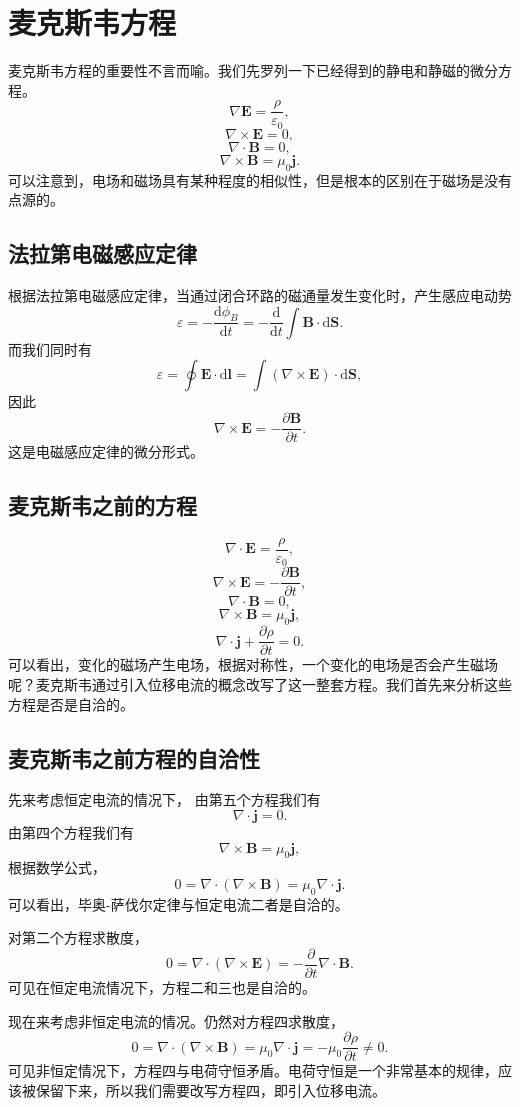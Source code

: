 \documentclass[UTF8]{ctexbook}
\renewcommand{\d}{\mathrm{d}}
\renewcommand{\b}{\boldsymbol}
\numberwithin{equation}{chapter}
\begin{document}
	\section{麦克斯韦方程}
	麦克斯韦方程的重要性不言而喻。我们先罗列一下已经得到的静电和静磁的微分方程。
	\[\nabla\b{E}=\frac{\rho}{\varepsilon_0},\]
	\[\nabla\times \b{E}=0,\]
	\[\nabla\cdot\b{B}=0,\]
	\[\nabla\times\b{B}=\mu_0\b{j}.\]
	可以注意到，电场和磁场具有某种程度的相似性，但是根本的区别在于磁场是没有点源的。
	\subsection{法拉第电磁感应定律}
	
	根据法拉第电磁感应定律，当通过闭合环路的磁通量发生变化时，产生感应电动势
	\[\varepsilon=-\frac{\d\phi_B}{\d t}=-\frac{\d }{\d t}\int\b{B}\cdot\d\b{S}.\]
	而我们同时有
	\[\varepsilon=\oint \b{E}\cdot\d\b{l}=\int(\nabla\times\b{E})\cdot\d\b{S},\]
	因此
	\[\nabla\times\b{E}=-\frac{\partial \b{B}}{\partial t}.\]
	这是电磁感应定律的微分形式。
	
	\subsection{麦克斯韦之前的方程}
	\[\nabla\cdot\b{E}=\frac{\rho}{\varepsilon_0},\]
	\[\nabla\times \b{E}=-\frac{\partial \b{B}}{\partial t},\]
	\[\nabla\cdot\b{B}=0,\]
	\[\nabla\times\b{B}=\mu_0\b{j},\]
	\[\nabla\cdot\b{j}+\frac{\partial \rho}{\partial t}=0.\]
	可以看出，变化的磁场产生电场，根据对称性，一个变化的电场是否会产生磁场呢？麦克斯韦通过引入位移电流的概念改写了这一整套方程。我们首先来分析这些方程是否是自洽的。
	
	\subsection{麦克斯韦之前方程的自洽性}
	先来考虑恒定电流的情况下， 由第五个方程我们有
	\[\nabla\cdot\b{j}=0.\]
	由第四个方程我们有
	\[\nabla\times\b{B}=\mu_0\b{j},\]
	根据数学公式，
	\[0=\nabla\cdot(\nabla\times\b{B})=\mu_0\nabla\cdot\b{j}.\]
	可以看出，毕奥-萨伐尔定律与恒定电流二者是自洽的。
	
	对第二个方程求散度，
	\[0=\nabla\cdot(\nabla\times\b{E})=-\frac{\partial}{\partial t}\nabla\cdot\b{B}.\]
	可见在恒定电流情况下，方程二和三也是自洽的。
	
	现在来考虑非恒定电流的情况。仍然对方程四求散度，
	\[0=\nabla\cdot(\nabla\times\b{B})=\mu_0\nabla\cdot\b{j}=-\mu_0\frac{\partial \rho}{\partial t}\neq 0.\]
	可见非恒定情况下，方程四与电荷守恒矛盾。电荷守恒是一个非常基本的规律，应该被保留下来，所以我们需要改写方程四，即引入位移电流。
	
\end{document}
